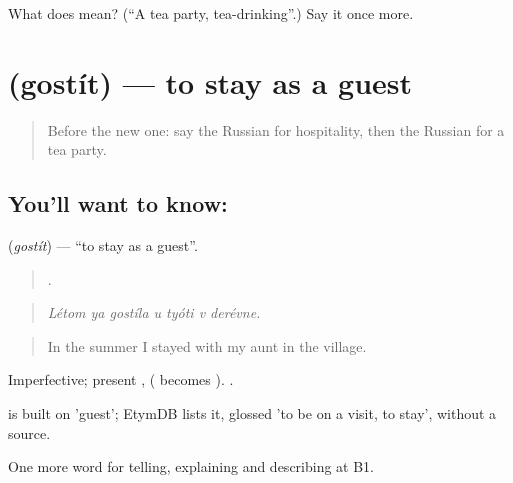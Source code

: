 \begin{tcolorbox}[breakable,colback=teal!4,colframe=teal!35!black,title={Before you move on}]
What does  mean? (\textquotedblleft{}A tea party, tea-drinking\textquotedblright{}.) Say it once more.
\end{tcolorbox}
\section[\texorpdfstring{\ru{гостить} (gostít)}{гостить (gostít)}]{ (gostít) — to stay as a guest}

\label{lesson:RU-C499-gostit}



\begin{quote}
Before the new one: say the Russian for hospitality, then the Russian for a tea party.
\end{quote}

\subsection*{You'll want to know: }
\textbf{} (\emph{gostít}) — \textquotedblleft{}to stay as a guest\textquotedblright{}.

\begin{quote}
      .
\end{quote}

\begin{quote}
\emph{Létom ya gostíla u tyóti v derévne.}
\end{quote}

\begin{quote}
In the summer I stayed with my aunt in the village.
\end{quote}

Imperfective; present ,  ( becomes ). \emph{  }.

\begin{cousinweb}
\emph{} is built on \emph{} 'guest'; EtymDB lists it, glossed 'to be on a visit, to stay', without a source.
\end{cousinweb}

\begin{grammarlens}[title={What you've built}]
One more word for telling, explaining and describing at B1.
\end{grammarlens}

